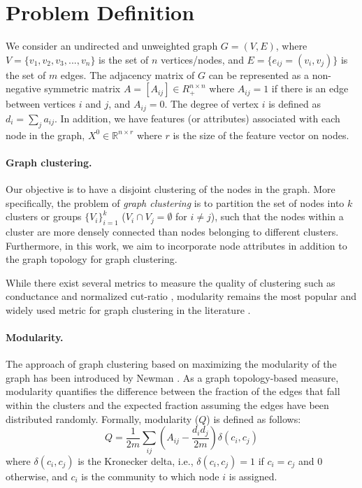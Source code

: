 \section{Problem Definition}
\label{sec:prob}



We consider an undirected and unweighted graph $G = (V, E)$,
where $V=\{v_1,v_2,v_3,...,v_n\}$ is the set of $n$ vertices/nodes, and
$E = \{e_{ij}=(v_i,v_j)\}$ is the set of $m$ edges. The adjacency matrix of $G$ can be represented as a non-negative symmetric
matrix $A = [A_{ij} ] \in R_+^{n \times n}$ where $A_{ij} = 1$ if there is an edge between vertices $i$ and $j$, and $A_{ij} = 0$. %
The degree of vertex $i$ is defined as $d_i = \sum_j a_{ij}$. 
In addition, we have features (or attributes) associated with each node in the graph, $X^0 \in \mathbb{R}^{n\times r}$ where $r$ is the size of the feature vector on nodes.  %


\paragraph{Graph clustering. }Our objective is to have a disjoint clustering of the nodes in the graph. More specifically, the problem of \textit{graph clustering} is to partition the set of nodes into $k$ clusters or groups $\{V_i \}^k_{i=1}$ ($V_i \cap V_j =\emptyset$  for $i \ne j$), %
such that the nodes within a cluster are more densely connected than nodes belonging to different clusters.  Furthermore, in this work, we aim to incorporate node attributes in addition to the graph topology for graph clustering. %

While there exist several metrics to measure the quality of clustering such as conductance \cite{yang2012defining} and normalized cut-ratio \cite{shi2000normalized}, modularity remains the most popular and widely used metric for graph clustering in the literature \cite{fortunato2016community}. 

\paragraph{Modularity. }The approach of graph clustering based on maximizing the modularity of the graph has been introduced by Newman \cite{newman2006modularity}. As a graph topology-based measure, modularity \cite{newman2006modularity} quantifies the difference between the fraction of the edges that fall within the clusters and the expected fraction assuming the edges have been distributed randomly. Formally, modularity ($Q$) is defined as follows:
\begin{equation}
     Q=\frac{1}{2m}\sum_{ij}(A_{ij}-\frac{d_id_j}{2m})\delta(c_i,c_j)
\end{equation}
where $\delta(c_i ,c_j)$ is the Kronecker delta, i.e., $\delta(c_i,c_j)=1$ if $c_i=c_j$ and $0$ otherwise,
and $c_i$ is the community to which node $i$ is
assigned. 

